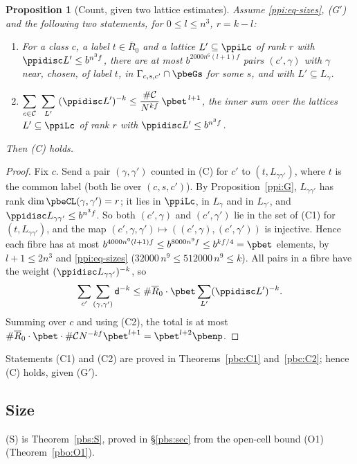 \documentclass[10pt]{amsart}
\newtheorem{proposition}[theorem]{Proposition}
\theoremstyle{definition}
\theoremstyle{remark}
\providecommand{\pbR}{\overline R_0}
\begin{document}
\begin{proposition}[Count, given two lattice estimates]\label{ppi:C}
Assume \eqref{ppi:eq-sizes}, \textup{(G$'$)} and the following two statements, for $0\le l\le n^3$,
$r=k-l$:
\begin{enumerate}
\item[(C1)] For a class $c$, a label $t\in\pbR$ and a lattice $L'\subseteq\ppiLc$ of rank $r$ with
$\ppidisc L'\le b^{n^3f}$, there are at most $b^{2000n^6(l+1)f}$ pairs $(c',\gamma)$ with $\gamma$ near,
chosen, of label $t$, in $\Gamma_{c,s,c'}\cap\pbeGs$ for some $s$, and with $L'\subseteq L_\gamma$.
\item[(C2)] $\displaystyle\sum_{c\in\mathcal C}\ \sum_{L'}\ (\ppidisc L')^{-k}\le\frac{\#\mathcal
C}{N^{kf}}\,\pbet^{\,l+1}$, the inner sum over the lattices $L'\subseteq\ppiLc$ of rank $r$ with
$\ppidisc L'\le b^{n^3f}$.
\end{enumerate}
Then \textup{(C)} holds.
\end{proposition}
\begin{proof}
Fix $c$. Send a pair $(\gamma,\gamma')$ counted in (C) for $c'$ to $(t,L_{\gamma\gamma'})$, where $t$
is the common label (both lie over $(c,s,c')$). By Proposition~\ref{ppi:G}, $L_{\gamma\gamma'}$ has
rank $\dim\pbeCL(\gamma,\gamma')=r$; it lies in $\ppiLc$, in $L_\gamma$ and in $L_{\gamma'}$, and
$\ppidisc L_{\gamma\gamma'}\le b^{n^3f}$. So both $(c',\gamma)$ and $(c',\gamma')$ lie in the set of
(C1) for $(t,L_{\gamma\gamma'})$, and the map $(c',\gamma,\gamma')\mapsto((c',\gamma),(c',\gamma'))$ is
injective. Hence each fibre has at most $b^{4000n^6(l+1)f}\le b^{8000n^9f}\le b^{kf/4}=\pbet$ elements, by
$l+1\le2n^3$ and \eqref{ppi:eq-sizes} ($32000\,n^9\le512000\,n^9\le k$). All pairs in a
fibre have the weight $(\ppidisc L_{\gamma\gamma'})^{-k}$, so
\[
\sum_{c'}\sum_{(\gamma,\gamma')}\mathsf d^{-k}\le\#\pbR\cdot\pbet\sum_{L'}(\ppidisc L')^{-k}.
\]
Summing over $c$ and using (C2), the total is at most $\#\pbR\cdot\pbet\cdot\#\mathcal CN^{-kf}
\pbet^{l+1}=\pbet^{l+2}\pbenp$.
\end{proof}

Statements (C1) and (C2) are proved in Theorems~\ref{pbc:C1} and~\ref{pbc:C2}; hence (C) holds, given (G$'$).

\subsection{Size}\label{ppi:ss-size}

\smallskip\noindent\textup{(S)} is Theorem~\ref{pbs:S}, proved in \S\ref{pbs:sec} from the open-cell bound \textup{(O1)} (Theorem~\ref{pbo:O1}).\par\smallskip
\end{document}
